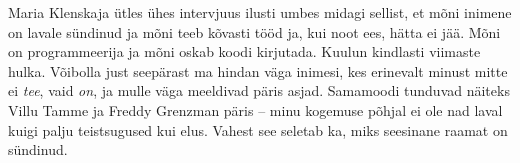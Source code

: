 Maria Klenskaja ütles ühes intervjuus ilusti umbes midagi sellist, et mõni inimene on lavale sündinud
ja mõni teeb kõvasti tööd ja, kui noot ees, hätta ei jää. Mõni on programmeerija ja 
mõni oskab koodi kirjutada. Kuulun kindlasti viimaste hulka. Võibolla just 
seepärast ma hindan väga inimesi, kes erinevalt minust mitte ei \emph{tee}, vaid \emph{on}, ja mulle väga meeldivad päris asjad.
Samamoodi tunduvad näiteks Villu Tamme ja Freddy Grenzman päris -- minu kogemuse põhjal ei ole nad laval 
kuigi palju teistsugused kui elus. Vahest see seletab ka, miks 
seesinane raamat on sündinud.